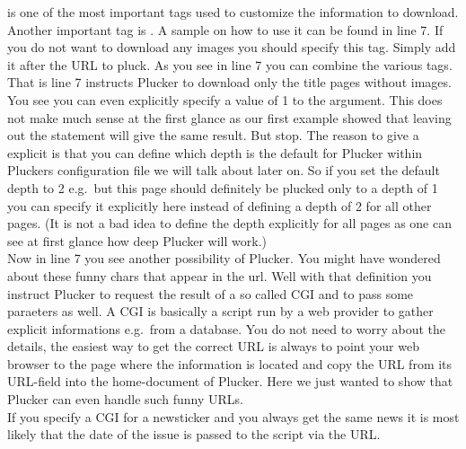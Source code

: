  is one of the most important tags used to customize
the information to download. Another important tag is
. A sample on how to use it can
be found in line 7. If you do not want to download any images you
should specify this tag.  Simply add it after the URL to
pluck. As you see in line 7 you can combine the various tags. That is
line 7 instructs Plucker to download only the title pages without
images. You see you can even explicitly specify a value of 1 to the
 argument. This does not make much sense at the first
glance as our first example showed that leaving out the
 statement will give the same result. But stop. The
reason to give a explicit  is that you can define which
depth is the default for Plucker within Pluckers configuration file we
will talk about later on. So if you set the default depth to 2 e.g.\
but this page should definitely be plucked only to a depth of 1 you can
specify it explicitly here instead of defining a depth of 2 for all
other pages. (It is not a bad idea to define the depth explicitly for
all pages as one can see at first glance how deep Plucker will
work.)\\

Now in line 7 you see another possibility of Plucker. You might have
wondered about these funny chars that appear in the url. Well with
that definition you instruct Plucker to request the result of a so
called CGI and to pass some paraeters as well. A CGI is basically a
script run by a web provider to gather explicit informations e.g.\ from
a database. You do not need to worry about the details, the easiest
way to get the correct URL is always to point your web browser to the
page where the information is located and copy the URL from its
URL-field into the home-document of Plucker. Here we just wanted to
show that Plucker can even handle such funny URLs.\\

\hint{} If you specify a CGI for a newsticker and you always get the
same news it is most likely that the date of the issue is passed to
the script via the URL.\\

